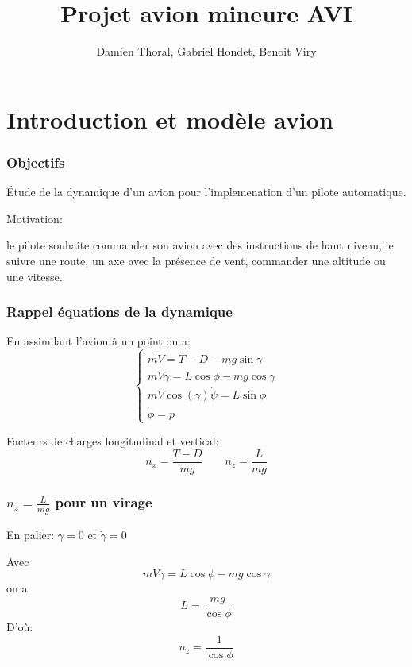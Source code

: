 \documentclass[tikz, footheight=2em]{beamer}
\title{Projet avion mineure AVI}
\author{Damien Thoral, Gabriel Hondet, Benoit Viry}
\date{}
\begin{document}
\frame{\titlepage}

\section{Introduction et modèle avion}

\begin{frame}
    \frametitle{Objectifs} \pause{}
    \begin{center}
        Étude de la dynamique d'un avion pour l'implemenation d'un pilote
        automatique.
    \end{center} \pause{}
    Motivation:
    \begin{center}
        le pilote souhaite commander son avion avec des instructions de haut
        niveau, ie suivre une route, un axe avec la présence de vent, commander
        une altitude ou une vitesse.
    \end{center}
\end{frame}

\begin{frame}
    \frametitle{Rappel équations de la dynamique} \pause{}
    En assimilant l'avion à un point on a:
    \[
    \left \{
    \begin{array}{l}
        m\dot{V} = T - D - mg\sin \gamma \\
        mV\dot{\gamma} = L\cos \phi - mg \cos \gamma \\
        mV \cos (\gamma) \dot{\psi} = L \sin \phi \\
        \dot{\phi} = p
    \end{array}
    \right.
    \] \pause{}

    Facteurs de charges longitudinal et vertical:
    \[
    n_x = \frac{T - D}{mg} \qquad n_z = \frac{L}{mg}
    \] \pause{}
    \begin{center}
    \end{center}
\end{frame}

\begin{frame}
    \frametitle{\(n_z = \frac{L}{mg}\) pour un virage}\pause{}
    En palier: \(\gamma = 0\) et \(\dot{\gamma} = 0\) \pause{}

    Avec \[ mV\dot{\gamma} = L\cos \phi - mg \cos \gamma \]
    on a \[ L=\frac{mg}{\cos \phi}\] \pause{}
    D'où:\[ \boxed{n_z = \frac{1}{\cos \phi}}\]
\end{frame}
\end{document}
